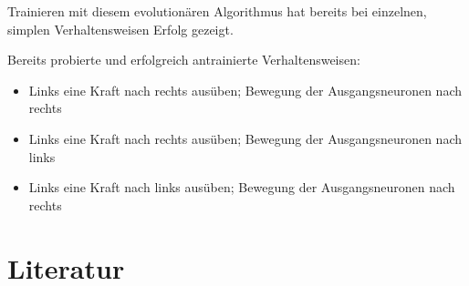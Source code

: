 \documentclass[parskip]{scrartcl}
\begin{document}
Trainieren mit diesem evolutionären Algorithmus hat bereits bei einzelnen, simplen Verhaltensweisen Erfolg gezeigt.

Bereits probierte und erfolgreich antrainierte Verhaltensweisen:

\begin{itemize}
    \item Links eine Kraft nach rechts ausüben; Bewegung der Ausgangsneuronen nach rechts 
    \item Links eine Kraft nach rechts ausüben; Bewegung der Ausgangsneuronen nach links
    \item Links eine Kraft nach links ausüben; Bewegung der Ausgangsneuronen nach rechts
\end{itemize}


\section{Literatur}

\printbibliography
\end{document}
